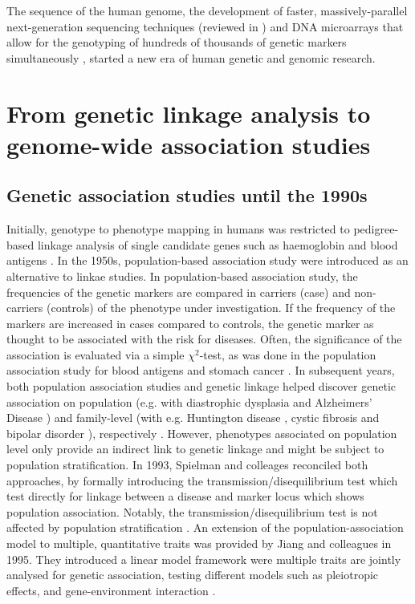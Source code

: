 The sequence of the human genome, the development of faster, massively-parallel next-generation sequencing techniques (reviewed in \citep{Shendure2008,Heather2016}) and DNA microarrays that allow for the genotyping of hundreds of thousands of genetic markers simultaneously \citep{Wang1998}, started a new era of human genetic and genomic research. 

\section{From genetic linkage analysis to genome-wide association studies}
\subsection{Genetic association studies until the 1990s}
Initially, genotype to phenotype mapping in humans was restricted to pedigree-based linkage analysis \citep{Bernstein1930,Haldane1934,Penrose1935} of single candidate genes such as haemoglobin \citep{Ingram1959} and blood antigens \citep{Bernstein1930,Haldane1934,Penrose1935}. In the 1950s, population-based association study were introduced as an alternative to linkae studies. In population-based association study, the frequencies of the genetic markers are compared in carriers (case) and non-carriers (controls) of the phenotype under investigation. If the frequency of the markers are increased in cases compared to controls, the genetic marker as thought to be associated with the risk for diseases. Often, the significance of the association is evaluated via a simple \(\chi ^2\)-test, as was done in the population association study for blood antigens and stomach cancer \citep{Aird1953,Aird1954}. In subsequent years, both population association studies and genetic linkage helped discover genetic association on population (e.g. with diastrophic dysplasia \citep{Hästbacka1992} and Alzheimers' Disease \citep{Strittmatter1996}) and family-level (with e.g. Huntington disease \citep{Gusella1983}, cystic fibrosis \citep{Kerem1989} and bipolar disorder \citep{Baron1987}), respectively . However, phenotypes associated on population level only provide an indirect link to genetic linkage \citep{Cox1988,Spielman1993} and might be subject to population stratification. In 1993, Spielman and colleages reconciled both approaches, by formally introducing the transmission/disequilibrium test which test directly for linkage between a disease and marker locus which shows population association. Notably, the transmission/disequilibrium test is not affected by population stratification \citep{Spielman1993}. An extension of the population-association model to multiple, quantitative traits was provided by Jiang and colleagues in 1995. They introduced a linear model framework were multiple traits are jointly analysed for genetic association, testing different models such as pleiotropic effects, and gene-environment interaction \citep{Jiang1995}. 

